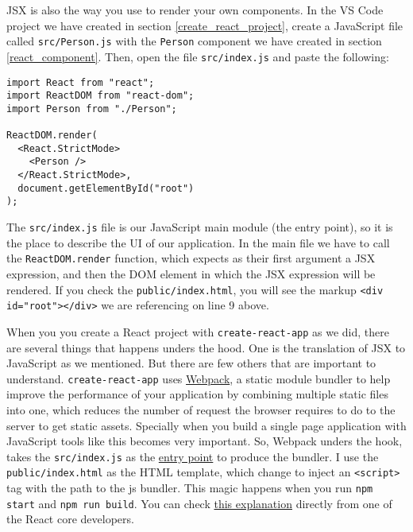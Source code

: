 \documentclass[a4paper, oneside, titlepage, 12pt]{book}
\begin{document}
JSX is also the way you use to render your own components. In the VS Code project we have created in section \ref{create_react_project}, create a JavaScript file called \texttt{src/Person.js} with the \texttt{Person} component we have created in section \ref{react_component}. Then, open the file \texttt{src/index.js} and paste the following:

\begin{verbatim}
import React from "react";
import ReactDOM from "react-dom";
import Person from "./Person";

ReactDOM.render(
  <React.StrictMode>
    <Person />
  </React.StrictMode>,
  document.getElementById("root")
);
\end{verbatim}

The \texttt{src/index.js} file is our JavaScript main module (the entry point), so it is the place to describe the UI of our application. In the main file we have to call the \texttt{ReactDOM.render} function, which expects as their first argument a JSX expression, and then the DOM element in which the JSX expression will be rendered. If you check the \texttt{public/index.html}, you will see the markup \texttt{<div id="root"></div>} we are referencing on line 9 above. 

\begin{displayquote}
{\small When you you create a React project with \texttt{create-react-app} as we did, there are several things that happens unders the hood. One is the translation of JSX to JavaScript as we mentioned. But there are few others that are important to understand. \texttt{create-react-app} uses \href{https://webpack.js.org/}{Webpack}, a static module bundler to help improve the performance of your application by combining multiple static files into one, which reduces the number of request the browser requires to do to the server to get static assets. Specially when you build a single page application with JavaScript tools like this becomes very important. So, Webpack unders the hook, takes the \texttt{src/index.js} as the \href{https://webpack.js.org/concepts/#entry}{entry point} to produce the bundler. I use the \texttt{public/index.html} as the HTML template, which change to inject an \texttt{<script>} tag with the path to the js bundler. This magic happens when you run \texttt{npm start} and \texttt{npm run build}. You can check \href{https://stackoverflow.com/questions/42438171/wheres-the-connection-between-index-html-and-index-js-in-a-create-react-app-app}{this explanation} directly from one of the React core developers.}
\end{displayquote}
\end{document}
